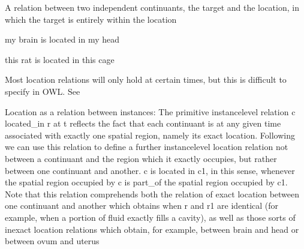 \documentclass[letterpaper,10pt,english]{sphinxmanual}
\begin{document}
\begin{sphinxShadowBox}

\sphinxAtStartPar
A relation between two independent continuants, the target and the location, in which the target is entirely within the location
\end{sphinxShadowBox}

\begin{sphinxShadowBox}

\sphinxAtStartPar
my brain is located in my head

\sphinxAtStartPar
this rat is located in this cage
\end{sphinxShadowBox}

\begin{sphinxShadowBox}

\sphinxAtStartPar
Most location relations will only hold at certain times, but this is difficult to specify in OWL. See 

\sphinxAtStartPar
Location as a relation between instances: The primitive instance\sphinxhyphen{}level relation c located\_in r at t reflects the fact that each continuant is at any given time associated with exactly one spatial region, namely its exact location. Following we can use this relation to define a further instance\sphinxhyphen{}level location relation \sphinxhyphen{} not between a continuant and the region which it exactly occupies, but rather between one continuant and another. c is located in c1, in this sense, whenever the spatial region occupied by c is part\_of the spatial region occupied by c1.    Note that this relation comprehends both the relation of exact location between one continuant and another which obtains when r and r1 are identical (for example, when a portion of fluid exactly fills a cavity), as well as those sorts of inexact location relations which obtain, for example, between brain and head or between ovum and uterus
\end{sphinxShadowBox}

\begin{sphinxShadowBox}

\sphinxAtStartPar
{}
\end{sphinxShadowBox}
\begin{quote}

\ignorespaces \end{quote}
\end{document}
